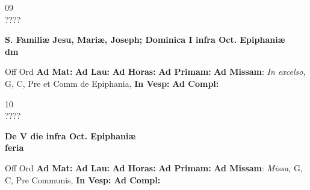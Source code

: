 \documentclass[10pt, openany]{book}
\begin{document}
    \begin{center}
        \begin{minipage}{3.5in}
            \vspace{2em}
            \begin{minipage}{0.5in}
                {\Huge 09} \\
                {\normalsize ????}
            \end{minipage}
            \begin{minipage}{3.0in}
                \textbf{ \large S. Familiæ Jesu, Mariæ, Joseph; Dominica I infra Oct. Epiphaniæ \\
                \textnormal{\normalsize dm}}

            \end{minipage}
            \begin{justify}Off Ord
                \textbf{Ad Mat: }
                \textbf{Ad Lau: }
                \textbf{Ad Horas: }
                \textbf{Ad Primam: }\textbf{Ad Missam}: \textit{In excelso,} G, C, Pre et Comm de Epiphania, 
                \textbf{In Vesp: }
                \textbf{Ad Compl: }
            \end{justify}
        \end{minipage}
    \end{center}

    \begin{center}
        \begin{minipage}{3.5in}
            \vspace{2em}
            \begin{minipage}{0.5in}
                {\Huge 10} \\
                {\normalsize ????}
            \end{minipage}
            \begin{minipage}{3.0in}
                \textbf{ \large De V die infra Oct. Epiphaniæ \\
                \textnormal{\normalsize feria}}

            \end{minipage}
            \begin{justify}Off Ord
                \textbf{Ad Mat: }
                \textbf{Ad Lau: }
                \textbf{Ad Horas: }
                \textbf{Ad Primam: }\textbf{Ad Missam}: \textit{Missa,} G, C, Pre Communis, 
                \textbf{In Vesp: }
                \textbf{Ad Compl: }
            \end{justify}
        \end{minipage}
    \end{center}
\end{document}
